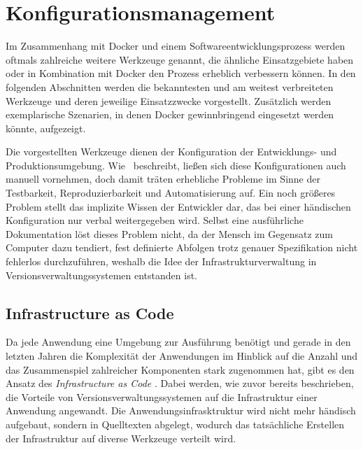 \chapter{Konfigurationsmanagement}
\label{cha:konfigurationsmanagement}
Im Zusammenhang mit Docker und einem Softwareentwicklungsprozess werden oftmals zahlreiche weitere Werkzeuge genannt, die ähnliche Einsatzgebiete haben oder in Kombination mit Docker den Prozess erheblich verbessern können.
In den folgenden Abschnitten werden die bekanntesten und am weitest verbreiteten Werkzeuge und deren jeweilige Einsatzzwecke vorgestellt.
Zusätzlich werden exemplarische Szenarien, in denen Docker gewinnbringend eingesetzt werden könnte, aufgezeigt.

Die vorgestellten Werkzeuge dienen der Konfiguration der Entwicklungs- und Produktionsumgebung.
Wie~\autocite[29\psq]{Wolff201604} beschreibt, ließen sich diese Konfigurationen auch manuell vornehmen, doch damit träten erhebliche Probleme im Sinne der Testbarkeit, Reproduzierbarkeit und Automatisierung auf.
Ein noch größeres Problem stellt das implizite Wissen der Entwickler dar, das bei einer händischen Konfiguration nur verbal weitergegeben wird.
Selbst eine ausführliche Dokumentation löst dieses Problem nicht, da der Mensch im Gegensatz zum Computer dazu tendiert, fest definierte Abfolgen trotz genauer Spezifikation nicht fehlerlos durchzuführen, weshalb die Idee der Infrastrukturverwaltung in Versionsverwaltungssystemen entstanden ist.


\section{Infrastructure as Code}
\label{sec:infrastructureascode}
Da jede Anwendung eine Umgebung zur Ausführung benötigt und gerade in den letzten Jahren die Komplexität der Anwendungen im Hinblick auf die Anzahl und das Zusammenspiel zahlreicher Komponenten stark zugenommen hat, gibt es den Ansatz des \emph{Infrastructure as Code} \autocite{InfrastructureAsCode:online}.
Dabei werden, wie zuvor bereits beschrieben, die Vorteile von Versionsverwaltungssystemen auf die Infrastruktur einer Anwendung angewandt.
Die Anwendungsinfrasktruktur wird nicht mehr händisch aufgebaut, sondern in Quelltexten abgelegt, wodurch das tatsächliche Erstellen der Infrastruktur auf diverse Werkzeuge verteilt wird.

